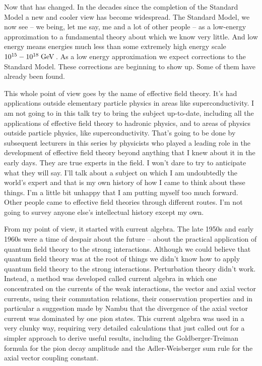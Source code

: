 \documentclass[12pt]{article}
\def\gev{{\rm GeV}\,}
\begin{document}
Now that has changed. In the decades since the completion of the Standard Model a new and cooler view has become widespread. The Standard Model, we now see -- we being, let me say, me and a lot of other people -- as a low-energy approximation to a fundamental theory about which we know very little. And low energy means energies much less than some extremely high energy scale $10^{15}-10^{18}\;\gev$. As a low energy approximation we expect corrections to the Standard Model.  These corrections are beginning to show up. Some of them have already been found. 

This whole point of view goes by the name of effective field theory. It's had applications outside elementary particle physics in areas like superconductivity. I am not going to in this talk try to bring the subject up-to-date, including all the applications of effective field theory to hadronic physics, and to areas of physics outside particle physics, like superconductivity. That's going to be done by subsequent lecturers in this series by physicists who played a leading role in the development of effective field theory beyond anything that I knew about it in the early days. They are true experts in the field. I won't dare to try to anticipate what they will say. I'll talk about a subject on which I am undoubtedly the world's expert and that is my own history of how I came to think about these things. I'm a little bit unhappy that I am putting myself too much forward. Other people came to effective field theories through different routes. I'm not going to survey anyone else's intellectual history except my own.

From my point of view, it started with current algebra. The late 1950s and early 1960s were a time of despair about the future -- about the practical application of quantum field theory to the strong interactions. Although we could believe that quantum field theory  was at the root of things we didn't know how to apply quantum field theory to the strong interactions. Perturbation theory didn't work. Instead, a method was developed called current algebra in which one concentrated on the currents of the weak interactions, the vector and axial vector currents, using their commutation relations, their conservation properties and in particular a suggestion made by Nambu that the divergence of the axial vector current was dominated by one pion states. This current algebra was used in a very clunky way, requiring very detailed calculations that just called out for a simpler approach to derive useful results, including the Goldberger-Treiman formula for the pion decay amplitude and  the Adler-Weisberger sum rule  for the axial vector coupling constant. 
\end{document}
